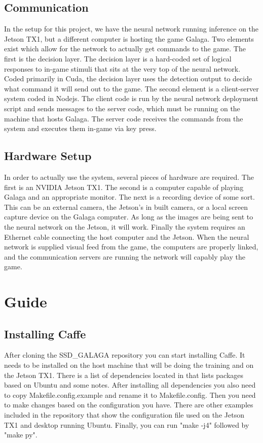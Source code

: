 \documentclass[onecolumn, draftclsnofoot,10pt, compsoc]{IEEEtran}
\begin{document}
\subsection{Communication}
In the setup for this project, we have the neural network running inference on the Jetson TX1, but a different computer is hosting the game Galaga.
Two elements exist which allow for the network to actually get commands to the game.
The first is the decision layer.
The decision layer is a hard-coded set of logical responses to in-game stimuli that sits at the very top of the neural network.
Coded primarily in Cuda, the decision layer uses the detection output to decide what command it will send out to the game.
The second element is a client-server system coded in Nodejs. 
The client code is run by the neural network deployment script and sends messages to the server code, which must be running on the machine that hosts Galaga.
The server code receives the commands from the system and executes them in-game via key press.

\subsection{Hardware Setup}
In order to actually use the system, several pieces of hardware are required.
The first is an NVIDIA Jetson TX1.
The second is a computer capable of playing Galaga and an appropriate monitor.
The next is a recording device of some sort.
This can be an external camera, the Jetson's in built camera, or a local screen capture device on the Galaga computer.
As long as the images are being sent to the neural network on the Jetson, it will work.
Finally the system requires an Ethernet cable connecting the host computer and the Jetson.
When the neural network is supplied visual feed from the game, the computers are properly linked, and the communication servers are running the network will capably play the game.
\section{Guide}

\subsection{Installing Caffe}

After cloning the SSD\_GALAGA repository you can start installing Caffe.
It needs to be installed on the host machine that will be doing the training and on the Jetson TX1.
There is a list of dependencies located in  that lists packages based on Ubuntu and some notes.
After installing all dependencies you also need to copy Makefile.config.example and rename it to Makefile.config.
Then you need to make changes based on the configuration you have.
There are other examples included in the repository that show the configuration file used on the Jetson TX1 and desktop running Ubuntu.
Finally, you can run "make -j4" followed by "make py".
\end{document}
